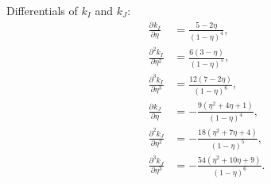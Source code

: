 \documentclass[english]{../thermomemo/thermomemo}
\newcommand*{\pd}[3][]{\frac{\partial^{#1}#2}{\partial{#3}^{#1}}}%
\newcommand*{\pdc}[3]{\frac{\partial^{2}#1}{\partial{#2}\partial{#3}}}%
\newcommand*{\pdcc}[3]{\frac{\partial^{3}#1}{\partial{#2}^{2}\partial{#3}}}%
\newcommand*{\lb}{\left(}
\newcommand*{\rb}{\right)}
\newcommand{\Bt}{\ensuremath{\tilde{B}}\xspace}
\begin{document}
Differentials of $k_I$ and $k_J$:
\begin{align}
  \pd{k_I}{\eta} &= \frac{5-2\eta}{\lb 1 - \eta\rb^4},\\
  \pd[2]{k_I}{\eta} &= \frac{6\lb 3-\eta \rb}{\lb 1 - \eta\rb^5},\\
  \pd[3]{k_I}{\eta} &= \frac{12\lb 7 - 2\eta\rb}{\lb 1 - \eta\rb^6},\\
  \pd{k_J}{\eta} &= -\frac{9\lb \eta^2 + 4 \eta + 1 \rb}{\lb 1 - \eta\rb^4},\\
  \pd[2]{k_J}{\eta} &= -\frac{18\lb \eta^2 + 7 \eta + 4 \rb}{\lb 1 - \eta\rb^5},\\
  \pd[3]{k_J}{\eta} &= -\frac{54\lb \eta^2 + 10 \eta + 9 \rb}{\lb 1 - \eta\rb^6}.
\end{align}
\end{document}
